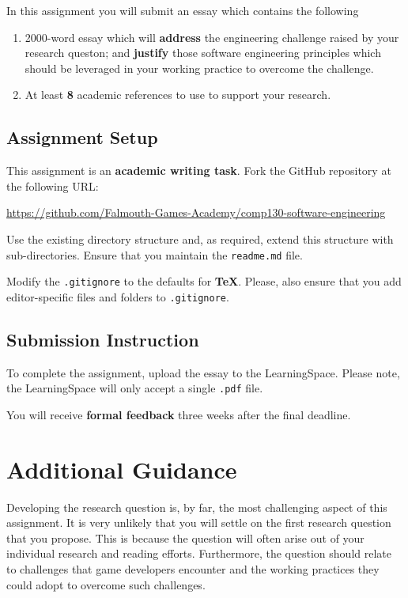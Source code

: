 \documentclass{../../../fal_assignment}
\begin{document}
In this assignment you will submit an essay which contains the following

\begin{enumerate}
	\item 2000-word essay which will \textbf{address} the engineering challenge raised by your research queston; and \textbf{justify} those software engineering principles which should be leveraged in your working practice to overcome the challenge. 
	\item At least \textbf{8} academic references to use to support your research.
\end{enumerate}



\subsection*{Assignment Setup}

This assignment is an \textbf{academic writing task}. Fork the GitHub repository at the following URL:

\indent \url{https://github.com/Falmouth-Games-Academy/comp130-software-engineering}

Use the existing directory structure and, as required, extend this structure with sub-directories. Ensure that you maintain the \texttt{readme.md} file.

Modify the \texttt{.gitignore} to the defaults for \textbf{TeX}. Please, also ensure that you add editor-specific files and folders to \texttt{.gitignore}. 

\subsection*{Submission Instruction}

To complete the assignment, upload the essay to the LearningSpace. Please note, the LearningSpace will only accept a single \texttt{.pdf} file.

You will receive \textbf{formal feedback} three weeks after the final deadline.

\section*{Additional Guidance}

Developing the research question is, by far, the most challenging aspect of this assignment. It is very unlikely that you will settle on the first research question that you propose. This is because the question will often arise out of your individual research and reading efforts. Furthermore, the question should relate to challenges that game developers encounter and the working practices they could adopt to overcome such challenges. 
\end{document}
